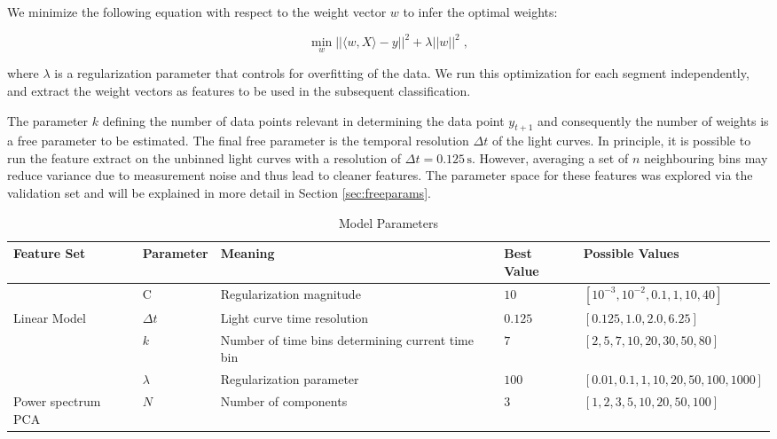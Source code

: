 \documentclass[12pt]{emulateapj}
\begin{document}
We minimize the following equation with respect to the weight vector $w$ to infer the optimal weights:

\begin{equation}
\min_w ||\langle w, X \rangle - y||^2 + \lambda ||w||^2 \; ,
\end{equation}

\noindent where $\lambda$ is a regularization parameter that controls for overfitting of the data. We run this optimization for each segment independently, and extract the weight vectors as features to be used in the subsequent classification.

The parameter $k$ defining the number of data points relevant in determining the data point $y_{t+1}$ and consequently the number of weights is a free parameter to be estimated. The final free parameter is the temporal resolution $\Delta t$ of the light curves. In principle, it is possible to run the feature extract on the unbinned light curves with a resolution of $\Delta t = 0.125\,\mathrm{s}$. However, averaging a set of $n$ neighbouring bins may reduce variance due to measurement noise and thus lead to cleaner features. The parameter space for these features was explored via the validation set and will be explained in more detail in Section \ref{sec:freeparams}.

\begin{table}[hbtp]
\renewcommand{\arraystretch}{1.3}
\footnotesize
\caption{Model Parameters}
\begin{threeparttable} 
\begin{tabularx}{\textwidth}{p{2.0cm}p{2.0cm}p{5.0cm}p{1.0cm}p{6.0cm}}
\toprule
\bf{Feature Set} & \bf{Parameter} & \bf{Meaning} & Best Value &  \bf{Possible Values} \\ \midrule
		& C & Regularization magnitude & $10$ & $[10^{-3}, 10^{-2}, 0.1, 1, 10, 40]$ \\ \midrule
 Linear Model & $\Delta t$ & Light curve time resolution & $0.125$ & $[0.125, 1.0, 2.0, 6.25]$ \\
		& $k$ & Number of time bins determining current time bin & $7$ & $[2, 5, 7, 10, 20, 30, 50, 80]$ \\
		& $\lambda$ & Regularization parameter & $100$ & $[0.01, 0.1, 1, 10, 20, 50, 100, 1000]$ \\ \midrule
Power spectrum PCA & $N$ & Number of components & $3$ & $[1,2,3,5,10,20,50,100]$ \\

 \bottomrule
\end{tabularx}
   \begin{tablenotes}
      \item{}
\end{tablenotes}
\end{threeparttable}
\label{table:parameters}
\end{table}
\end{document}
